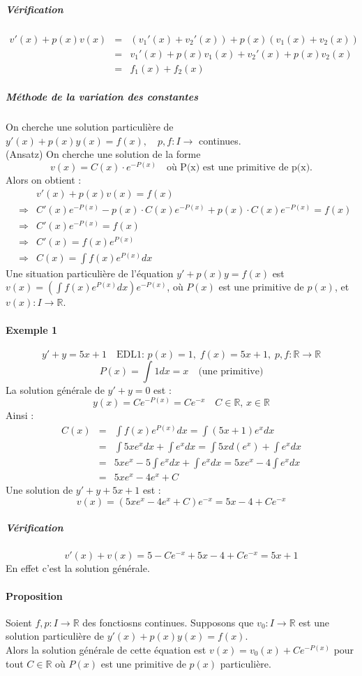 \message{ !name(analyse-02.tex)}\documentclass[1Opt]{report}
\begin{document}
\subparagraph{Vérification}
\begin{eqnarray*}
  v'(x)+p(x)v(x) & = & (v_1'(x)+v_2'(x))+p(x)(v_1(x)+v_2(x))\\
  & = & v_1'(x)+p(x)v_1(x)+v_2'(x)+p(x)v_2(x)\\
  & = & f_1(x)+f_2(x)
\end{eqnarray*}

\subparagraph{Méthode de la variation des constantes}
On cherche une solution particulière de $y'(x)+p(x)y(x)=f(x),\quad
p,f:I\rightarrow$ continues.\\
(Ansatz) On cherche une solution de la forme
\[v(x)=C(x)\cdot e^{-P(x)} \quad \mbox{où P(x) est une primitive de p(x).}\]
Alors on obtient :
\begin{eqnarray*}
  & & v'(x)+p(x)v(x)=f(x)\\
  & \Rightarrow & C'(x)e^{-P(x)}-p(x)\cdot C(x)e^{-P(x)}+p(x)\cdot C(x)e^{-P(x)}=f(x)\\
  & \Rightarrow & C'(x)e^{-P(x)}=f(x)\\
  & \Rightarrow & C'(x)=f(x)e^{P(x)}\\
  & \Rightarrow & C(x)=\int{f(x)e^{P(x)}dx}
\end{eqnarray*}
Une situation particulière de l'équation $y'+p(x)y=f(x)$ est
$v(x)=(\int{f(x)e^{P(x)}dx})e^{-P(x)}$, où $P(x)$ est une primitive de $p(x)$,
et $v(x):I\rightarrow{\mathbb R}$.

\paragraph{Exemple 1}
\[y'+y=5x+1\quad \mbox{EDL1: }p(x)=1,\;f(x)=5x+1,\;p,f:\mathbb{R}\rightarrow\mathbb{R}\]
\[P(x)=\int{1dx}=x \quad\mbox{(une primitive)}\]
La solution générale de $y'+y=0$ est :
\[y(x)=Ce^{-P(x)}=Ce^{-x}\quad C\in\mathbb{R},\, x\in\mathbb{R}\]
Ainsi :
\begin{eqnarray*}
  C(x) & = & \int{f(x)e^{P(x)}dx}=\int{(5x+1)e^xdx}\\
  & = & \int{5xe^xdx}+\int{e^xdx}=\int{5xd(e^x)}+\int{e^xdx}\\
  & = & 5xe^x-5\int{e^xdx}+\int{e^xdx}=5xe^x-4\int{e^xdx}\\
  & = & 5xe^x-4e^x+C
\end{eqnarray*}
Une solution de $y'+y+5x+1$ est :
\[v(x)=(5xe^x-4e^x+C)e^{-x}=5x-4+Ce^{-x}\]

\subparagraph{Vérification}
\[v'(x)+v(x)=5-Ce^{-x}+5x-4+Ce^{-x}=5x+1\]
En effet c'est la solution générale.


\paragraph{Proposition}
Soient $f,p:I\rightarrow\mathbb{R}$ des fonctiosns continues. Supposons que
$v_0:I\rightarrow\mathbb{R}$ est une solution particulière de
$y'(x)+p(x)y(x)=f(x)$.\\
Alors la solution générale de cette équation est $v(x)=v_0(x)+Ce^{-P(x)}$ pour
tout $C\in\mathbb{R}$ où $P(x)$ est une primitive de $p(x)$ particulière.
\end{document}
